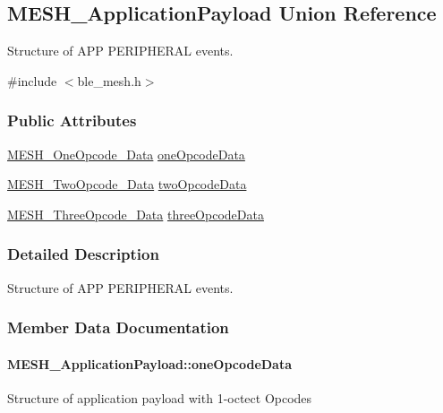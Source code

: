 \hypertarget{union_m_e_s_h___application_payload}{}\subsection{M\+E\+S\+H\+\_\+\+Application\+Payload Union Reference}
\label{union_m_e_s_h___application_payload}


Structure of A\+PP P\+E\+R\+I\+P\+H\+E\+R\+AL events.  




{\ttfamily \#include $<$ble\+\_\+mesh.\+h$>$}

\subsubsection*{Public Attributes}
\begin{DoxyCompactItemize}
\item 
\hyperlink{struct_m_e_s_h___one_opcode___data}{M\+E\+S\+H\+\_\+\+One\+Opcode\+\_\+\+Data} \hyperlink{union_m_e_s_h___application_payload_a8b6a8a5db38ee4c31f81f1418d907514}{one\+Opcode\+Data}
\item 
\hyperlink{struct_m_e_s_h___two_opcode___data}{M\+E\+S\+H\+\_\+\+Two\+Opcode\+\_\+\+Data} \hyperlink{union_m_e_s_h___application_payload_a5f06db46b03f97799a775325c9f9246f}{two\+Opcode\+Data}
\item 
\hyperlink{struct_m_e_s_h___three_opcode___data}{M\+E\+S\+H\+\_\+\+Three\+Opcode\+\_\+\+Data} \hyperlink{union_m_e_s_h___application_payload_a5e3e1054179df6b737f60086c4b30503}{three\+Opcode\+Data}
\end{DoxyCompactItemize}


\subsubsection{Detailed Description}
Structure of A\+PP P\+E\+R\+I\+P\+H\+E\+R\+AL events. 

\subsubsection{Member Data Documentation}
\paragraph[{\texorpdfstring{one\+Opcode\+Data}{oneOpcodeData}}]{ M\+E\+S\+H\+\_\+\+Application\+Payload\+::one\+Opcode\+Data}\hypertarget{union_m_e_s_h___application_payload_a8b6a8a5db38ee4c31f81f1418d907514}{}\label{union_m_e_s_h___application_payload_a8b6a8a5db38ee4c31f81f1418d907514}
Structure of application payload with 1-\/octect Opcodes 
